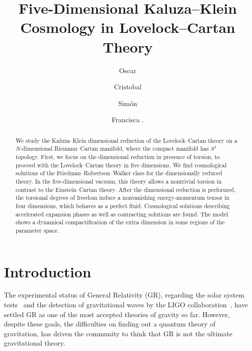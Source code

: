 \documentclass[aps,prd,12pt,superscriptaddress,showpacs,showkeys,longbibliography,reprint,nofootinbib]{revtex4-1}
\begin{document}
\title{Five-Dimensional Kaluza--Klein Cosmology in Lovelock--Cartan Theory}

\author{Oscar }

\author{Cristobal }

\author{Sim\'on }

\author{Francisca .}

\begin{abstract}
 We study the Kaluza--Klein dimensional reduction of the Lovelock--Cartan theory on a $N$-dimensional Riemann--Cartan manifold, where the compact manifold has $S^1$ topology. First, we focus on the dimensional reduction in presence of torsion, to proceed with the Lovelock--Cartan theory in five dimensions. We find cosmological solutions of the Friedman--Robertson--Walker class for the dimensionally reduced theory. In the five-dimensional vacuum, this theory allows a nontrivial torsion in contrast to the Einstein--Cartan theory. After the dimensional reduction is performed, the torsional degrees of freedom induce a nonvanishing energy-momentum tensor in four dimensions, which behaves as a perfect fluid. Cosmological solutions describing accelerated expansion phases as well as contracting solutions are found. The model shows a dynamical compactification of the extra dimension in some regions of the parameter space. 
\end{abstract}



\maketitle

\section{Introduction}

The experimental status of General Relativity (GR), regarding the solar system tests~\cite{Will:2014kxa} and the detection of gravitational waves by the LIGO collaboration~\cite{Abbott:2016blz}, have settled GR as one of the most accepted theories of gravity so far. However, despite these goals, the difficulties on finding out a quantum theory of gravitation, has driven the community to think that GR is not the ultimate gravitational theory. 
\end{document}

